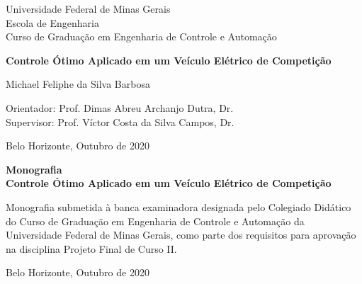 \begin{titlepage}
	\begin{center}
		{\large Universidade Federal de Minas Gerais\\
			Escola de Engenharia \\
			Curso de Graduação em Engenharia de Controle e Automação\\}

		\vspace{6cm}
		{\bf\Large Controle Ótimo Aplicado em\vspace{0.2cm}
			um Veículo Elétrico de Competição}
		\vspace{4cm}

		{\large Michael Feliphe da Silva Barbosa}
		\vspace{2cm}

		\vspace{2cm}
		{\large Orientador: Prof. Dimas Abreu Archanjo Dutra, Dr.}\\
		{\large Supervisor: Prof. Víctor Costa da Silva Campos, Dr.}

		\vfill
		{\large Belo Horizonte, Outubro de 2020}
	\end{center}

\end{titlepage}

\newpage
\clearpage
\thispagestyle{empty}


\begin{titlepage}

	\centering
	\textbf{Monografia}\\
	\vspace{2cm}
	\centering
	\textbf{Controle Ótimo Aplicado em um Veículo Elétrico de Competição}\\
	\vspace{5cm}

	\parbox{1.0\textwidth}
	{\large
		Monografia submetida à banca examinadora
		designada pelo Colegiado Didático do Curso de
		Graduação em Engenharia de Controle e
		Automação da Universidade Federal de Minas
		Gerais, como parte dos requisitos para aprovação na
		disciplina Projeto Final de Curso II.}

	\vspace{7cm}
	\centering
	Belo Horizonte, Outubro de 2020

\end{titlepage}

